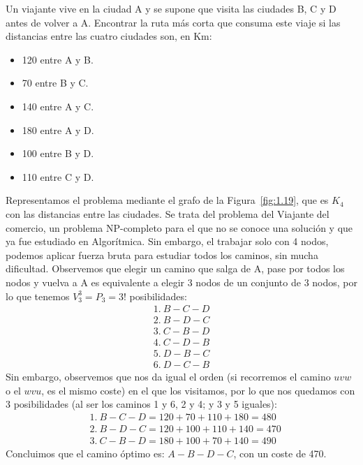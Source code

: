 \begin{ejercicio}\label{ej:1.19}
    Un viajante vive en la ciudad A y se supone que visita las ciudades B, C y D antes de volver a A. Encontrar la ruta más corta que consuma este viaje si las distancias entre las cuatro ciudades son, en Km:
    \begin{itemize}
        \item 120 entre A y B.
        \item 70 entre B y C.
        \item 140 entre A y C.
        \item 180 entre A y D.
        \item 100 entre B y D.
        \item 110 entre C y D.
    \end{itemize}

    Representamos el problema mediante el grafo de la Figura~\ref{fig:1.19}, que es $K_4$ con las distancias entre las ciudades. Se trata del problema del Viajante del comercio, un problema NP-completo para el que no se conoce una solución y que ya fue estudiado en Algorítmica. Sin embargo, el trabajar solo con 4 nodos, podemos aplicar fuerza bruta para estudiar todos los caminos, sin mucha dificultad. Observemos que elegir un camino que salga de A, pase por todos los nodos y vuelva a A es equivalente a elegir 3 nodos de un conjunto de 3 nodos, por lo que tenemos $V^3_3 = P_3 = 3!$ posibilidades:
    \begin{gather*}
        1.\  B-C-D \\
        2.\  B-D-C \\
        3.\  C-B-D \\
        4.\  C-D-B \\
        5.\  D-B-C \\
        6.\  D-C-B
    \end{gather*}
    Sin embargo, observemos que nos da igual el orden (si recorremos el camino $uvw$ o el $wvu$, es el mismo coste) en el que los visitamos, por lo que nos quedamos con 3 posibilidades (al ser los caminos 1 y 6, 2 y 4; y 3 y 5 iguales):
    \begin{align*}
        &1.\ B-C-D = 120 + 70 + 110 + 180 = 480 \\
        &2.\ B-D-C = 120 + 100 + 110 + 140 = 470 \\
        &3.\ C-B-D = 180 + 100 + 70 + 140 = 490
    \end{align*}
    Concluimos que el camino óptimo es: $A-B-D-C$, con un coste de 470.
    \begin{figure}
        \centering
\end{figure}
\end{ejercicio}

